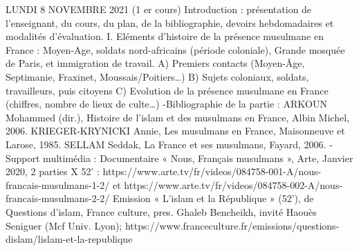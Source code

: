 LUNDI 8 NOVEMBRE 2021 (1
er cours)
Introduction : présentation de l’enseignant, du cours, du plan, de la bibliographie,
devoirs hebdomadaires et modalités d’évaluation.
I. Eléments d’histoire de la présence musulmane en France : Moyen-Age, soldats
nord-africains (période coloniale), Grande mosquée de Paris, et immigration de
travail.
A) Premiers contacts (Moyen-Âge, Septimanie, Fraxinet, Moussais/Poitiers…)
B) Sujets coloniaux, soldats, travailleurs, puis citoyens
C) Evolution de la présence musulmane en France (chiffres, nombre de lieux de
culte…)
-Bibliographie de la partie :
ARKOUN Mohammed (dir.), Histoire de l’islam et des musulmans en France, Albin
Michel, 2006.
KRIEGER-KRYNICKI Annie, Les musulmans en France, Maisonneuve et Larose,
1985.
SELLAM Seddak, La France et ses musulmans, Fayard, 2006.
-Support multimédia :
Documentaire « Nous, Français musulmans », Arte, Janvier 2020, 2 parties X 52’ :
https://www.arte.tv/fr/videos/084758-001-A/nous-francais-musulmans-1-2/ et
https://www.arte.tv/fr/videos/084758-002-A/nous-francais-musulmans-2-2/
Emission « L’islam et la République » (52’), de Questions d’islam, France culture,
pres. Ghaleb Bencheikh, invité Haouès Seniguer (Mcf Univ. Lyon);
https://www.franceculture.fr/emissions/questions-dislam/lislam-et-la-republique